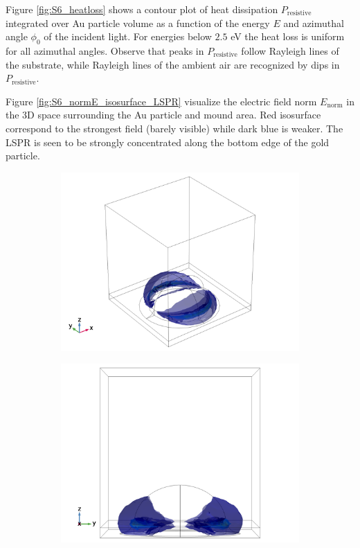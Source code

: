 Figure \ref{fig:S6_heatloss} shows a contour plot of heat dissipation $P_{\text{resistive}}$ integrated over Au particle volume as a function of the energy $E$ and azimuthal angle $\phi_0$ of the incident light. For energies below $2.5$ eV the heat loss is uniform for all azimuthal angles. Observe that peaks in $P_{\text{resistive}}$ follow Rayleigh lines of the substrate, while Rayleigh lines of the ambient air are recognized by dips in $P_{\text{resistive}}$.

Figure \ref{fig:S6_normE_isosurface_LSPR} visualize the electric field norm $E_\text{norm}$ in the 3D space surrounding the Au particle and mound area. Red isosurface correspond to the strongest field (barely visible) while dark blue is weaker. The LSPR is seen to be strongly concentrated along the bottom edge of the gold particle.
\begin{figure}[h]
    \begin{subfigure}{0.32\textwidth}
        \centering
        \includegraphics[width=\linewidth, trim=0.4cm 0 1.5cm 0, clip]{figures/ch4/S6/normE/Sample6_nomE_wl585_phi0_TE.png}
        \caption{}
    \end{subfigure}
    \begin{subfigure}{0.33\textwidth}
        \centering
        \includegraphics[width=\linewidth, trim=0.6cm 0 1.6cm 0, clip]{figures/ch4/S6/normE/Sample6_nomE_wl585_phi0_TE_xtowardsviewer.png}

\end{subfigure}
\end{figure}
